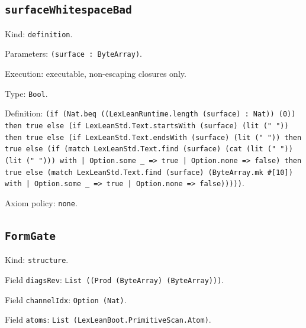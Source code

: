 \documentclass[11pt]{article}
\begin{document}
\subsection*{\texttt{surfaceWhitespaceBad}}
\noindent Kind: \texttt{definition}.\par
\noindent Parameters: \texttt{(surface : ByteArray)}.\par
\noindent Execution: executable, non-escaping closures only.\par
\noindent Type: \texttt{Bool}.\par
\noindent Definition: \texttt{(if (Nat.beq ((LexLeanRuntime.length (surface) : Nat)) (0)) then true else (if LexLeanStd.Text.startsWith (surface) (lit (" ")) then true else (if LexLeanStd.Text.endsWith (surface) (lit (" ")) then true else (if (match LexLeanStd.Text.find (surface) (cat (lit (" ")) (lit (" "))) with | Option.some \_ => true | Option.none => false) then true else (match LexLeanStd.Text.find (surface) (ByteArray.mk \#[10]) with | Option.some \_ => true | Option.none => false)))))}.\par
\noindent Axiom policy: \texttt{none}.\par
\subsection*{\texttt{FormGate}}
\noindent Kind: \texttt{structure}.\par
\noindent Field \texttt{diagsRev}: \texttt{List ((Prod (ByteArray) (ByteArray)))}.\par
\noindent Field \texttt{channelIdx}: \texttt{Option (Nat)}.\par
\noindent Field \texttt{atoms}: \texttt{List (LexLeanBoot.PrimitiveScan.Atom)}.\par
\end{document}
